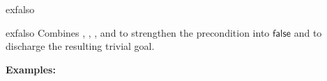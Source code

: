 \begin{tactic}{exfalso}
  \begin{tsyntax}{exfalso}
  Combines , , ,
   and  to strengthen the precondition
  into $\mathsf{false}$ and to discharge the resulting trivial goal.

  \textbf{Examples:}
  \begin{mathpar}
    {}%
    \quad{} \\
    {}%
    \quad{} \\
    {}%
    \quad{} \\
  \end{mathpar}
  \end{tsyntax}
\end{tactic}
